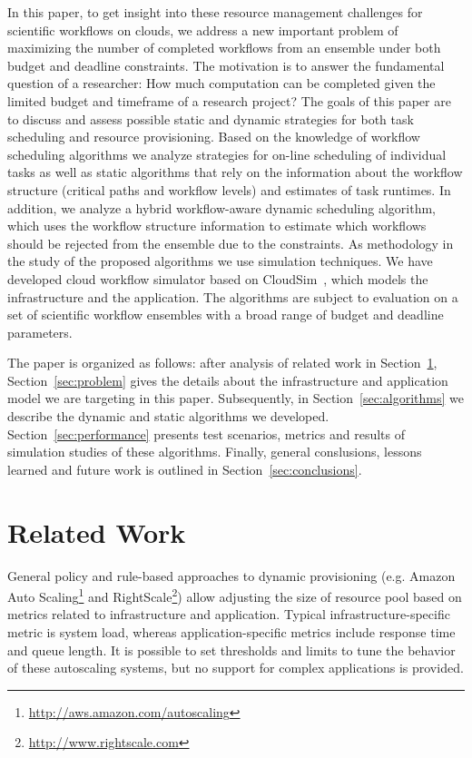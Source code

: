 \documentclass{sig-alternate}
\begin{document}
In this paper, to get insight into these resource management challenges for
scientific workflows on clouds, we address a new important problem of maximizing
the number of completed workflows from an ensemble under both budget and
deadline constraints. The motivation is to answer the fundamental question of a
researcher: How much computation can be completed given the limited budget and 
timeframe of a research project? The goals of this paper are to discuss and assess possible
static and dynamic strategies for both task scheduling and resource
provisioning. Based on the knowledge of workflow scheduling algorithms we
analyze strategies for on-line scheduling of individual tasks as well as static
algorithms that rely on the information about the workflow structure (critical
paths and workflow levels) and estimates of task runtimes. In addition, we
analyze a hybrid workflow-aware dynamic scheduling algorithm, which uses the
workflow structure information to estimate which workflows should be rejected
from the ensemble due to the constraints. As methodology in the study of the
proposed algorithms we use simulation techniques. We have developed cloud workflow simulator based on
CloudSim~\cite{Calheiros11}, which models the infrastructure and the application. The
algorithms are subject to evaluation on a set of scientific workflow ensembles with a broad range of
budget and deadline parameters. 

The paper is organized as follows: after analysis of related work in
Section~\ref{sec:related}, Section~\ref{sec:problem} gives the details about the
infrastructure and application model we are targeting in this paper.
Subsequently, in Section~\ref{sec:algorithms} we describe the dynamic and
static algorithms we developed. Section~\ref{sec:performance} presents test
scenarios, metrics and results of simulation studies of these algorithms.
Finally, general conslusions, lessons learned and future work is outlined in
Section~\ref{sec:conclusions}.

\section{Related Work}
\label{sec:related}
General policy and rule-based approaches to dynamic provisioning (e.g. Amazon
Auto Scaling\footnote{\url{http://aws.amazon.com/autoscaling}} and
RightScale\footnote{\url{http://www.rightscale.com}}) allow adjusting the size
of resource pool based on metrics related to infrastructure and application.
Typical infrastructure-specific metric is system load, whereas
application-specific metrics include response time and queue length. It is
possible to set thresholds and limits to tune the behavior of these autoscaling
systems, but no support for complex applications is provided.
\end{document}
